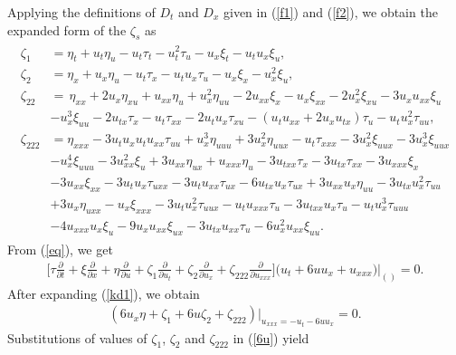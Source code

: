 Applying the definitions of $D_t$ and $D_x$ given in (\ref{f1}) and (\ref{f2}), we obtain the expanded form of the $\zeta_s$  as \vspace{0.005cm}
\begin{align}  \begin{aligned}
\zeta_1& = \eta_t + u_t\eta_u - u_t\tau_t - u_t^2\tau_u - u_x\xi_t - u_tu_x\xi_u,\\ 
\zeta_2& = \eta_x + u_x \eta_u - u_t \tau_x - u_t u_x \tau_u - u_x\xi_x - u_x^2\xi_u,\\
\zeta_{22}& = \,  \eta_{xx} + 2u_x \eta_{xu} + u_{xx} \eta_u + u_x^2 \eta_{uu} - 2u_{xx} \xi_x
-u_x \xi_{xx} - 2u_x^2 \xi_{xu} - 3u_xu_{xx} \xi_u \\
&
- u_x^3 \xi_{uu}- 2u_{tx} \tau_x - u_t \tau_{xx}  - 2u_tu_x \tau_{xu} - (u_tu_{xx} + 2u_xu_{tx}) \tau_u - u_t u_x^2 \tau_{uu},\\
\zeta_{222}&= \eta_{xxx}
-3u_{t}u_xu_{t}u_{xx}\tau_{uu}+u_{x}^3\eta_{uuu}+3u_{x}^2\eta_{uux}-u_t\tau_{xxx}-3u^2_x\xi_{uux}-3u_{x}^3 \xi_{uux} \\
&
-u_{x}^4\xi_{uuu}-3u_{xx}^2 \xi_{u}+3u_{xx} \eta_{ux} +u_{xxx}\eta_u-3u_{txx}\tau_{x} -3u_{tx}\tau_{xx}-3u_{xxx} \xi_{x}\\
&
-3u_{xx}\xi_{xx}-3u_t u_{x}\tau_{uxx} -3u_t u_{xx} \tau_{ux}-6u_{tx} u_x \tau_{ux}+3u_{xx} u_x\eta_{uu}-3u_{tx}u_{x}^2 \tau_{uu} \\
&
+3u_{x}\eta_{uxx}-u_{x}\xi_{xxx}-3u_{t} u_{x}^2\tau_{uux}-u_{t} u_{xxx}\tau_u -3u_{txx} u_x\tau_u-u_{t} u_{x}^3\tau_{uuu}\\
&
-4u_{xxx} u_x\xi_u-9 u_{x} u_{xx}\xi_{ux}-3u_{tx} u_{xx}\tau_u-6u_{x}^2 u_{xx}\xi_{uu}.
\end{aligned}
\end{align}
From (\ref{eq}), we get
\begin{align}
\Big[\tau\frac{\partial}{\partial t} + \xi\frac{\partial}{\partial x}
+ \eta\frac{\partial}{\partial u} + \zeta_1\frac{\partial}{\partial u_t} + \zeta_2
\frac{\partial}{\partial u_x} + \zeta_{222}\frac{\partial}{\partial u_{xxx}}\Big]\Big(u_{t}+6 uu_x+ u_{xxx}\Big)\Big|_{ (\label{kd1})} = 0.
\end{align}
After expanding   (\ref{kd1}), we obtain
\begin{align} \label{6u}
(6u_x \eta +\zeta_1 +6u \zeta_{2}+ \zeta_{222})\Big|_{u_{xxx}=-u_{t}-6 uu_x} = 0.
\end{align}
Substitutions of values of $\zeta_1$, $\zeta_2$ and $\zeta_{222}$ in   (\ref{6u}) yield
